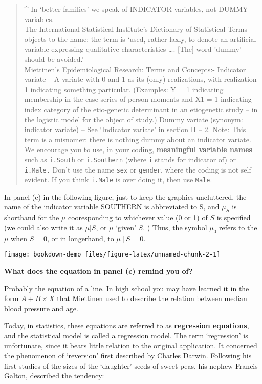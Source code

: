 \documentclass[]{book}
\begin{document}
\begin{quote}
\^{} In `better families' we speak of INDICATOR variables, not DUMMY variables.\\
The International Statistical Institute's Dictionary of Statistical Terms objects to the name: the term is `used, rather laxly, to denote an artificial variable expressing qualitative characteristics \ldots{}. {[}The{]} word 'dummy' should be avoided.'\\
Miettinen's Epidemiological Research: Terms and Concepts:- Indicator variate -- A variate with 0 and 1 as its (only) realizations, with realization 1 indicating something particular. (Examples: Y = 1 indicating membership in the case series of person-moments and X1 = 1 indicating index category of the etio-genetic determinant in an etiogenetic study -- in the logistic model for the object of study.) Dummy variate (synonym: indicator variate) -- See `Indicator variate' in section II -- 2. Note: This term is a misnomer: there is nothing dummy about an indicator variate.\\
We encourage you to use, in your coding, \textbf{meaningful variable names} such as \texttt{i.South} or \texttt{i.Southern} (where \texttt{i} stands for indicator of) or \texttt{i.Male.} Don't use the name \texttt{sex} or \texttt{gender}, where the coding is not self evident. If you think \texttt{i.Male} is over doing it, then use \texttt{Male}.
\end{quote}

In panel (c) in the following figure, just to keep the graphics uncluttered, the name of the indicator variable SOUTHERN is abbreviated to S, and \(\mu_S\) is shorthand for the \(\mu\) cooresponding to whichever value (0 or 1) of \(S\) is specified (we could also write it as \(\mu | S\), or \(\mu\) `given' \(S\). ) Thus, the symbol \(\mu_0\) refers to the \(\mu\) when \(S=0\), or in longerhand, to \(\mu \ | \ S = 0\).

\begin{center}\texttt{[image: bookdown-demo\_files/figure-latex/unnamed-chunk-2-1]} \end{center}

\textbf{What does the equation in panel (c) remind you of?}

Probably the equation of a line. In high school you may have learned it in the form \(A + B \times X\) that Miettinen used to describe the relation between median blood pressure and age.

Today, in statistics, these equations are referred to as \textbf{regression equations}, and the statistical model is called a regression model. The term `regression' is unfortunate, since it bears little relation to the original application. It concerned the phenomenon of `reversion' first described by Charles Darwin. Following his first studies of the sizes of the `daughter' seeds of sweet peas, his nephew Francis Galton, described the tendency:
\end{document}
